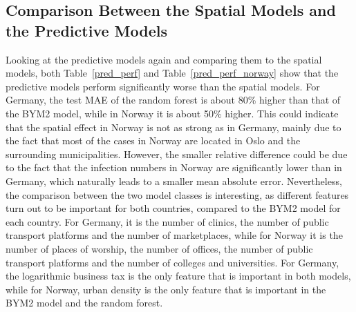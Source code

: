 \subsection{Comparison Between the Spatial Models and the Predictive Models}
Looking at the predictive models again and comparing them to the spatial models, both Table~\ref{pred_perf} and Table~\ref{pred_perf_norway} show that the predictive models perform significantly worse than the spatial models. For Germany, the test MAE of the random forest is about 80\% higher than that of the BYM2 model, while in Norway it is about 50\% higher. This could indicate that the spatial effect in Norway is not as strong as in Germany, mainly due to the fact that most of the cases in Norway are located in Oslo and the surrounding municipalities. However, the smaller relative difference could be due to the fact that the infection numbers in Norway are significantly lower than in Germany, which naturally leads to a smaller mean absolute error. Nevertheless, the comparison between the two model classes is interesting, as different features turn out to be important for both countries, compared to the BYM2 model for each country. For Germany, it is the number of clinics, the number of public transport platforms and the number of marketplaces, while for Norway it is the number of places of worship, the number of offices, the number of public transport platforms and the number of colleges and universities. For Germany, the logarithmic business tax is the only feature that is important in both models, while for Norway, urban density is the only feature that is important in the BYM2 model and the random forest. \\
